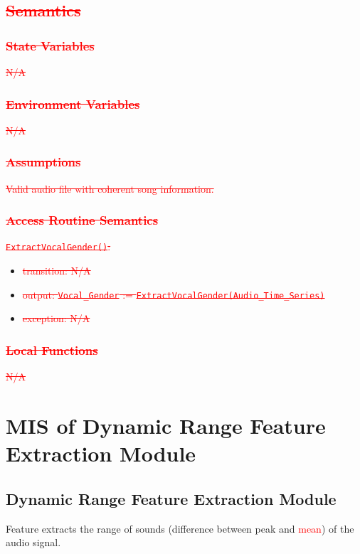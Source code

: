 \documentclass[12pt, titlepage]{article}
\begin{document}
\subsection{\textcolor{red}{\sout{Semantics}}}

\subsubsection{\textcolor{red}{\sout{State Variables}}}
\textcolor{red}{\sout{N/A}}

\subsubsection{\textcolor{red}{\sout{Environment Variables}}}
\textcolor{red}{\sout{N/A}}

\subsubsection{\textcolor{red}{\sout{Assumptions}}}
\textcolor{red}{\sout{Valid audio file with coherent song information.}}

\subsubsection{\textcolor{red}{\sout{Access Routine Semantics}}}

\noindent \textcolor{red}{\sout{\texttt{ExtractVocalGender()}:}}
\begin{itemize}
\item \textcolor{red}{\sout{transition: N/A}}
\item \textcolor{red}{\sout{output: \texttt{Vocal\_Gender} := \texttt{ExtractVocalGender(Audio\_Time\_Series)}}}
\item \textcolor{red}{\sout{exception: N/A}}
\end{itemize}

\subsubsection{\textcolor{red}{\sout{Local Functions}}}
\textcolor{red}{\sout{N/A}}


\section{MIS of Dynamic Range Feature Extraction Module} 

\subsection{Dynamic Range Feature Extraction Module}
Feature extracts the range of sounds (difference between peak and \textcolor{red}{mean}) of the audio signal.
\end{document}
